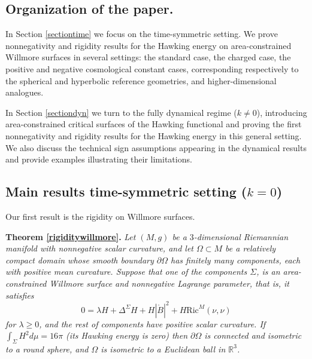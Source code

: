 \documentclass[12pt,a4paper]{amsart}
\theoremstyle{plain}
\theoremstyle{definition}
\begin{document}
\subsection{Organization of the paper.}
In Section \ref{sectiontime} we focus on the time-symmetric setting. We prove nonnegativity and rigidity results for the Hawking energy on area-constrained Willmore surfaces in several settings: the standard case, the charged case, the positive and negative cosmological constant cases, corresponding respectively to the spherical and hyperbolic reference geometries, and higher-dimensional analogues.

In Section \ref{sectiondyn} we turn to the fully dynamical regime ($k\neq 0$), introducing area-constrained critical surfaces of the Hawking functional and proving the first nonnegativity and rigidity results for the Hawking energy in this general setting. We also discuss the technical sign assumptions appearing in the dynamical results and provide examples illustrating their limitations.







\subsection{Main results time-symmetric setting (\texorpdfstring{$k=0$}))}




Our first result is the rigidity on  Willmore surfaces.

\noindent\textbf{Theorem \ref{rigiditywillmore}.} \emph{Let $(M,g)$ be a $3$-dimensional Riemannian manifold with nonnegative scalar curvature,  and let  $\Omega \subset M$ be a relatively compact domain whose smooth boundary  $\partial \Omega $  has finitely many components, each with positive mean curvature. Suppose that one of the components $\Sigma$, is an area-constrained Willmore surface  and nonnegative Lagrange parameter, that is, it  satisfies
    \begin{equation*}
        0= \lambda H  +\Delta^{\Sigma} H + H|\mathring{B}|^2+ H \mathrm{Ric}^M(\nu, \nu)
    \end{equation*}
   for $\lambda \geq 0$, and the rest of components have positive scalar curvature.  If  $\int_{\Sigma } H^2 d\mu =16 \pi   $ (its Hawking energy is zero)  then   $ \partial \Omega$ is connected and  isometric to a round sphere, and $\Omega$ is isometric to a Euclidean ball in $\mathbb{R}^3$.}   
\end{document}
